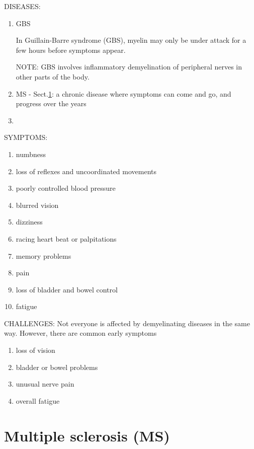 DISEASES:
\begin{enumerate}
  
  \item GBS
  
   In Guillain-Barre syndrome (GBS), myelin may only be under attack for a few hours before symptoms appear.
   
  NOTE: GBS involves inflammatory demyelination of peripheral nerves in other parts of the body.
    
   
   \item MS - Sect.\ref{sec:MS-multiple-sclerosis}: a chronic disease where symptoms can come and go, and progress over the years
   
   
   \item 
\end{enumerate}

SYMPTOMS:
\begin{enumerate}
  \item  numbness
   \item loss of reflexes and uncoordinated movements
   \item poorly controlled blood pressure
   \item blurred vision
   \item dizziness
   \item racing heart beat or palpitations
   \item memory problems
   \item pain
   \item loss of bladder and bowel control
   \item fatigue
\end{enumerate}

CHALLENGES: Not everyone is affected by demyelinating diseases in the same way. However, there are common early symptoms
\begin{enumerate}
  \item loss of vision
  
  \item bladder or bowel problems
  \item unusual nerve pain
  \item overall fatigue
\end{enumerate}


\section{Multiple sclerosis (MS)}
\label{sec:MS-multiple-sclerosis}
\label{sec:multiple-sclerosis}


